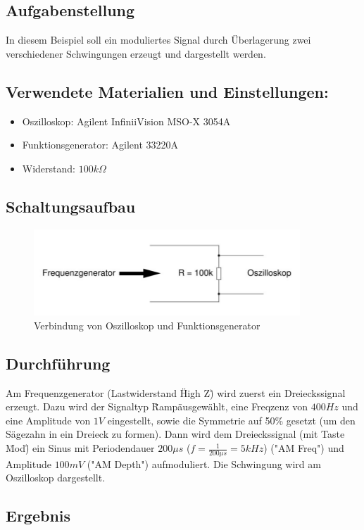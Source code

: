 \documentclass[12pt,a4paper,titlepage]{article}
\begin{document}
\subsection{Aufgabenstellung}
In diesem Beispiel soll ein moduliertes Signal durch Überlagerung zwei verschiedener Schwingungen erzeugt und dargestellt werden.

\subsection{Verwendete Materialien und Einstellungen:}
\begin{itemize}
  \item Oszilloskop: Agilent InfiniiVision MSO-X 3054A
  \item Funktionsgenerator: Agilent 33220A
  \item Widerstand: $100k\Omega$
\end{itemize}

\subsection{Schaltungsaufbau}
\begin{figure}[H]
  \centering
  \includegraphics[width=100mm]{oszi_sg.png}
  \caption{Verbindung von Oszilloskop und Funktionsgenerator}
  \label{Figure6.3.1}
\end{figure}

\subsection{Durchführung}
Am Frequenzgenerator (Lastwiderstand \"High Z\") wird zuerst ein Dreieckssignal erzeugt. Dazu wird der Signaltyp \"Ramp\" ausgewählt, eine Freqzenz von $400Hz$ und eine Amplitude von $1V$ eingestellt, sowie die Symmetrie auf 50\% gesetzt (um den Sägezahn in ein Dreieck zu formen). Dann wird dem Dreieckssignal (mit Taste \"Mod\") ein Sinus mit Periodendauer $200\mu s$ ($f = \frac{1}{200\mu s} = 5kHz$) ("AM Freq") und Amplitude $100mV$ ("AM Depth") aufmoduliert. Die Schwingung wird am Oszilloskop dargestellt.

\subsection{Ergebnis}
\end{document}
